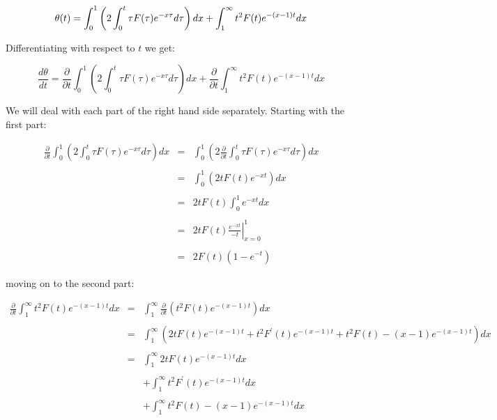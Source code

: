 \[
	\theta(t) = \int_{0}^{1} \left( 2 \int_{0}^{t} \tau F(\tau) e^{-x\tau} d\tau \right) dx + \int_{1}^{\infty} t^2 F(t) e^{-(x - 1)t} dx \\\\
\]\medskip

Differentiating with respect to $t$ we get: \bigskip

\[
	\frac{d \theta}{dt} = \frac{\partial}{\partial t}  \int_{0}^{1} \left( 2 \int_{0}^{t} \tau F(\tau) e^{-x\tau} d\tau \right) dx + \frac{\partial}{\partial t}  \int_{1}^{\infty} t^2 F(t) e^{-(x - 1)t} dx 
\]\medskip

We will deal with each part of the right hand side separately. Starting with the first part: \bigskip

\begin{eqnarray*}
	\frac{\partial}{\partial t}  \int_{0}^{1} \left( 2 \int_{0}^{t} \tau F(\tau) e^{-x\tau} d\tau \right) dx & = & \int_{0}^{1} \left( 2 \frac{\partial}{\partial t}  \int_{0}^{t} \tau F(\tau) e^{-x\tau} d\tau \right) dx \\\\
																											 & = & \int_{0}^{1} \left( 2 t F(t) e^{-xt} \right) dx \\\\
																											 & = & 2 t F(t) \int_{0}^{1} e^{-xt} dx \\\\
																											 & = & 2 t F(t) \left. \frac{e^{-xt}}{-t} \right|_{x = 0}^{1} \\\\
																											 & = & 2 F(t) (1 - e^{-t}) 
\end{eqnarray*}\medskip

moving on to the second part: \bigskip

\begin{eqnarray*}
	\frac{\partial}{\partial t}  \int_{1}^{\infty} t^2 F(t) e^{-(x - 1)t} dx & = & \int_{1}^{\infty} \frac{\partial}{\partial t}  \left( t^2 F(t) e^{-(x - 1)t} \right) dx \\\\
																			 & = & \int_{1}^{\infty} \left( 2 t F(t) e^{-(x - 1)t} + t^2 F^{\prime}(t) e^{-(x - 1)t} + t^2 F(t) -(x - 1) e^{-(x - 1)t} \right) dx \\\\
																			 & = & \int_{1}^{\infty} 2 t F(t) e^{-(x - 1)t} dx \\\\
																			 &   & + \int_{1}^{\infty} t^2 F^{\prime}(t) e^{-(x - 1)t} dx \\\\
																			 &   & + \int_{1}^{\infty} t^2 F(t) -(x - 1) e^{-(x - 1)t} dx 
\end{eqnarray*}\medskip

